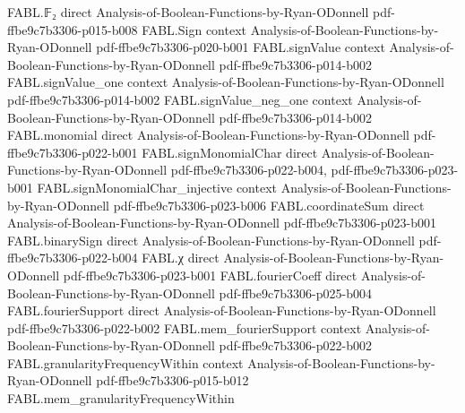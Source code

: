 \begin{theorem}
\leanok
{}
\proofstep
  {FABL.𝔽₂}
  {direct}
  {Analysis-of-Boolean-Functions-by-Ryan-ODonnell}
  {pdf-ffbe9c7b3306-p015-b008}
\proofstep
  {FABL.Sign}
  {context}
  {Analysis-of-Boolean-Functions-by-Ryan-ODonnell}
  {pdf-ffbe9c7b3306-p020-b001}
\proofstep
  {FABL.signValue}
  {context}
  {Analysis-of-Boolean-Functions-by-Ryan-ODonnell}
  {pdf-ffbe9c7b3306-p014-b002}
\proofstep
  {FABL.signValue_one}
  {context}
  {Analysis-of-Boolean-Functions-by-Ryan-ODonnell}
  {pdf-ffbe9c7b3306-p014-b002}
\proofstep
  {FABL.signValue_neg_one}
  {context}
  {Analysis-of-Boolean-Functions-by-Ryan-ODonnell}
  {pdf-ffbe9c7b3306-p014-b002}
\proofstep
  {FABL.monomial}
  {direct}
  {Analysis-of-Boolean-Functions-by-Ryan-ODonnell}
  {pdf-ffbe9c7b3306-p022-b001}
\proofstep
  {FABL.signMonomialChar}
  {direct}
  {Analysis-of-Boolean-Functions-by-Ryan-ODonnell}
  {pdf-ffbe9c7b3306-p022-b004,
    pdf-ffbe9c7b3306-p023-b001}
\proofstep
  {FABL.signMonomialChar_injective}
  {context}
  {Analysis-of-Boolean-Functions-by-Ryan-ODonnell}
  {pdf-ffbe9c7b3306-p023-b006}
\proofstep
  {FABL.coordinateSum}
  {direct}
  {Analysis-of-Boolean-Functions-by-Ryan-ODonnell}
  {pdf-ffbe9c7b3306-p023-b001}
\proofstep
  {FABL.binarySign}
  {direct}
  {Analysis-of-Boolean-Functions-by-Ryan-ODonnell}
  {pdf-ffbe9c7b3306-p022-b004}
\proofstep
  {FABL.χ}
  {direct}
  {Analysis-of-Boolean-Functions-by-Ryan-ODonnell}
  {pdf-ffbe9c7b3306-p023-b001}
\proofstep
  {FABL.fourierCoeff}
  {direct}
  {Analysis-of-Boolean-Functions-by-Ryan-ODonnell}
  {pdf-ffbe9c7b3306-p025-b004}
\proofstep
  {FABL.fourierSupport}
  {direct}
  {Analysis-of-Boolean-Functions-by-Ryan-ODonnell}
  {pdf-ffbe9c7b3306-p022-b002}
\proofstep
  {FABL.mem_fourierSupport}
  {context}
  {Analysis-of-Boolean-Functions-by-Ryan-ODonnell}
  {pdf-ffbe9c7b3306-p022-b002}
\proofstep
  {FABL.granularityFrequencyWithin}
  {context}
  {Analysis-of-Boolean-Functions-by-Ryan-ODonnell}
  {pdf-ffbe9c7b3306-p015-b012}
\proofstep
  {FABL.mem_granularityFrequencyWithin}

\end{theorem}
